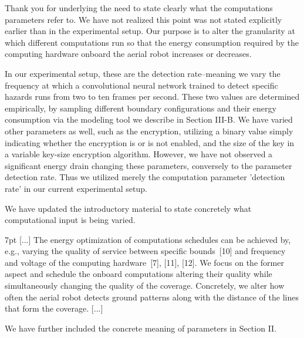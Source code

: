 \documentclass[10pt]{letter}
\newenvironment{formal}{%
  \def\FrameCommand{%
    \hspace{1pt}%
    {\color{red}\vrule width 2pt}%
    {\color{formalshade}\vrule width 4pt}%
    \colorbox{formalshade}%
  }%
  \MakeFramed{\advance\hsize-\width\FrameRestore}%
  \noindent\hspace{-4.55pt}%
  \begin{adjustwidth}{}{7pt}%
  \vspace{2pt}\vspace{2pt}%
}
{%
  \vspace{2pt}\end{adjustwidth}\endMakeFramed%
}
\begin{document}
  {\color{blue} 
  
  {\hspace*{-4.5em}{[R2:3]}\vspace*{-1.9em}}
  
  Thank you for underlying the need to state clearly what the computations parameters refer to. We have not realized this point was not stated explicitly earlier than in the experimental setup. Our purpose is to alter the granularity at which different computations run so that the energy consumption required by the computing hardware onboard the aerial robot increases or decreases.

  In our experimental setup, these are the detection rate--meaning we vary the frequency at which a convolutional neural network trained to detect specific hazards runs from two to ten frames per second. These two values are determined empirically, by sampling different boundary configurations and their energy consumption via the modeling tool we describe in Section III-B. We have varied other parameters as well, such as the encryption, utilizing a binary value simply indicating whether the encryption is or is not enabled, and the size of the key in a variable key-size encryption algorithm. However, we have not observed a significant energy drain changing these parameters, conversely to the parameter detection rate. Thus we utilized merely the computation parameter 'detection rate' in our current experimental setup. 

  We have updated the introductory material to state concretely what computational input is being varied.

  \begin{formal}\color{black}
    [...] The energy optimization of computations schedules can be achieved by, e.g., varying the quality of service between specific bounds~[{\color{green}10}] and frequency and voltage of the computing hardware~[{\color{green}7}], [{\color{green}11}], [{\color{green}12}]. We focus on the former aspect and schedule the onboard computations altering their quality while simultaneously changing the quality of the coverage.
    {\color{blue} Concretely, we alter how often the aerial robot detects ground patterns along with the distance of the lines that form the coverage.} [...]
    \vspace*{1ex}
  \end{formal}

  We have further included the concrete meaning of parameters in Section II.

}
\end{document}
